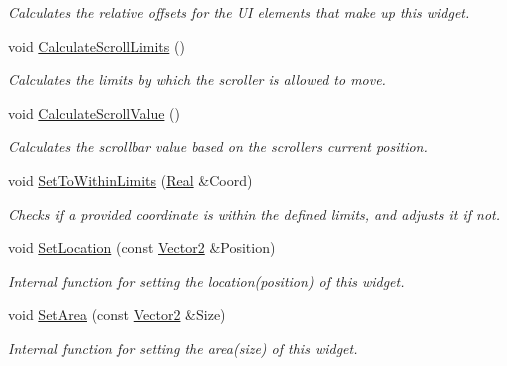 \begin{DoxyCompactItemize}
\begin{DoxyCompactList}\small\item\em Calculates the relative offsets for the UI elements that make up this widget. \item\end{DoxyCompactList}\item 
void \hyperlink{classphys_1_1UI_1_1Scrollbar_aa59e2c0662ac13fac037164c86f829f5}{CalculateScrollLimits} ()
\begin{DoxyCompactList}\small\item\em Calculates the limits by which the scroller is allowed to move. \item\end{DoxyCompactList}\item 
void \hyperlink{classphys_1_1UI_1_1Scrollbar_afc9eb290c8dcf3935e2b3046063989e9}{CalculateScrollValue} ()
\begin{DoxyCompactList}\small\item\em Calculates the scrollbar value based on the scrollers current position. \item\end{DoxyCompactList}\item 
void \hyperlink{classphys_1_1UI_1_1Scrollbar_a2048345c29ba15b8820971492f2bdea1}{SetToWithinLimits} (\hyperlink{namespacephys_af7eb897198d265b8e868f45240230d5f}{Real} \&Coord)
\begin{DoxyCompactList}\small\item\em Checks if a provided coordinate is within the defined limits, and adjusts it if not. \item\end{DoxyCompactList}\item 
void \hyperlink{classphys_1_1UI_1_1Scrollbar_add3d5f729e542fe17eda663fce86d3a3}{SetLocation} (const \hyperlink{classphys_1_1Vector2}{Vector2} \&Position)
\begin{DoxyCompactList}\small\item\em Internal function for setting the location(position) of this widget. \item\end{DoxyCompactList}\item 
void \hyperlink{classphys_1_1UI_1_1Scrollbar_a82ee692ee5215893d31dab0dd76374ba}{SetArea} (const \hyperlink{classphys_1_1Vector2}{Vector2} \&Size)
\begin{DoxyCompactList}\small\item\em Internal function for setting the area(size) of this widget. \item\end{DoxyCompactList}\item 

\end{DoxyCompactItemize}
